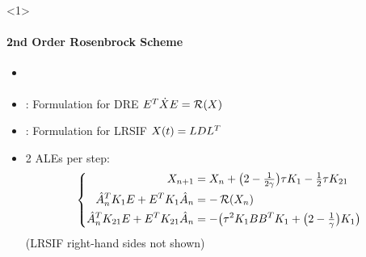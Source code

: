 \begin{frame}<1>{\subsecname}
\framesubtitle{2nd Order Rosenbrock Scheme}
\begin{bigpicturecols}
  \begin{itemize}
    \item
      \cite{Verwer1999}
    \item
      \cite{Mena2007}: Formulation for DRE $E^T \dot X E = \operatorname{\mathcal R}(X)$
    \item
      \cite{Lang2017}: Formulation for LRSIF $X(t) = LDL^T$
    \item
      2 ALEs per step:
      \begin{equation*}
      \left\{
      \begin{aligned}
        X_{n+1} &= X_n + \big( 2 - \tfrac{1}{2\gamma} \big) \tau K_1 - \tfrac{1}{2} \tau K_{21} \\
        \hat A_n^T K_1 E + E^T K_1 \hat A_n &= -\operatorname{\mathcal R}(X_n) \\
        \hat A_n^T K_{21} E + E^T K_{21} \hat A_n &= -\big( \tau^2 K_1 BB^T K_1 + \big( 2-\tfrac{1}{\gamma} \big) K_1 \big)
      \end{aligned}
      \right.
      \end{equation*}
      (LRSIF right-hand sides not shown)
  \end{itemize}
\column{\bigpicturewidth}
\end{bigpicturecols}
\end{frame}
